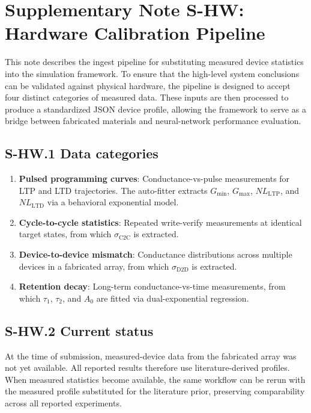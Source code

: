 
\section*{Supplementary Note S-HW: Hardware Calibration Pipeline}
\label{supp:hardware-calibration}

This note describes the ingest pipeline for substituting measured device statistics into the simulation framework. To ensure that the high-level system conclusions can be validated against physical hardware, the pipeline is designed to accept four distinct categories of measured data. These inputs are then processed to produce a standardized JSON device profile, allowing the framework to serve as a bridge between fabricated materials and neural-network performance evaluation.

\subsection*{S-HW.1 Data categories}

\begin{enumerate}[leftmargin=1.2em]
    \item \textbf{Pulsed programming curves}: Conductance-vs-pulse measurements for LTP and LTD trajectories. The auto-fitter extracts $G_{\min}$, $G_{\max}$, $NL_{\mathrm{LTP}}$, and $NL_{\mathrm{LTD}}$ via a behavioral exponential model.
    \item \textbf{Cycle-to-cycle statistics}: Repeated write-verify measurements at identical target states, from which $\sigma_{\mathrm{C2C}}$ is extracted.
    \item \textbf{Device-to-device mismatch}: Conductance distributions across multiple devices in a fabricated array, from which $\sigma_{\mathrm{D2D}}$ is extracted.
    \item \textbf{Retention decay}: Long-term conductance-vs-time measurements, from which $\tau_1$, $\tau_2$, and $A_0$ are fitted via dual-exponential regression.
\end{enumerate}

\subsection*{S-HW.2 Current status}

At the time of submission, measured-device data from the fabricated array was not yet available. All reported results therefore use literature-derived profiles. When measured statistics become available, the same workflow can be rerun with the measured profile substituted for the literature prior, preserving comparability across all reported experiments.
